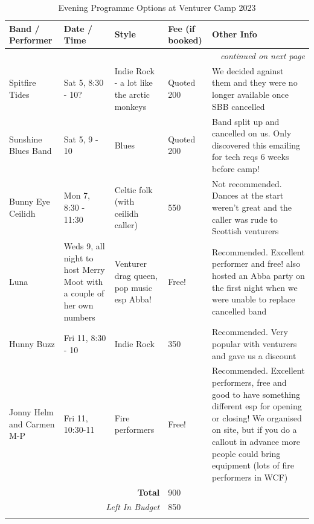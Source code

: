 {\RaggedRight \centering
\begin{longtable}{p{} p{} p{} p{} p{}}
\textbf{Band / Performer} & \textbf{Date / Time} & \textbf{Style} & \textbf{Fee (if booked)} & \textbf{Other Info} \\ 
\hline
\endhead

\multicolumn{5}{r}{\footnotesize\itshape continued on next page}\\
\endfoot 

\endlastfoot

\rowcolor[HTML]{EA9999} 
Spitfire Tides & Sat 5, 8:30 - 10? & Indie Rock - a lot like the arctic monkeys & Quoted 200 & We decided against them and they were no longer available once SBB cancelled \\
\hline
\rowcolor[HTML]{F9CB9C} 
Sunshine Blues Band & Sat 5, 9 - 10 & Blues & Quoted 200 & Band split up and cancelled on us. Only discovered this emailing for tech reqs 6 weeks before camp! \\
\hline
\rowcolor[HTML]{B6D7A8} 
Bunny Eye Ceilidh & Mon 7, 8:30 - 11:30 & Celtic folk (with ceilidh caller) & 550 & Not recommended. Dances at the start weren't great and the caller was rude to Scottish venturers \\
\hline
\rowcolor[HTML]{B6D7A8} 
Luna & Weds 9, all night to host Merry Moot with a couple of her own numbers & Venturer drag queen, pop music esp Abba! & Free! & Recommended. Excellent performer and free! also hosted an Abba party on the first night when we were unable to replace cancelled band \\
\hline
\rowcolor[HTML]{B6D7A8} 
Hunny Buzz & Fri 11, 8:30 - 10 & Indie Rock & 350 & Recommended. Very popular with venturers and gave us a discount \\
\hline
\rowcolor[HTML]{B6D7A8} 
Jonny Helm and Carmen M-P & Fri 11, 10:30-11 & Fire performers & Free! & Recommended. Excellent performers, free and good to have something different esp for opening or closing! We organised on site, but if you do a callout in advance more people could bring equipment (lots of fire performers in WCF) \\
\hline
\multicolumn{3}{r}{\textbf{Total}} & 900 & \\
\hline
\multicolumn{3}{r}{\textit{Left In Budget}} & 850 & \\
\hline

\caption{Evening Programme Options at Venturer Camp 2023}
\end{longtable}
}%

